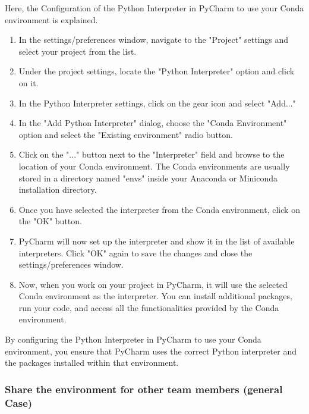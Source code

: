 Here, the Configuration of the Python Interpreter in PyCharm to use your Conda environment is explained.

\begin{enumerate}
	\item In the settings/preferences window, navigate to the "Project" settings and select your project from the list.
	
	\item Under the project settings, locate the "Python Interpreter" option and click on it.
	
	\item In the Python Interpreter settings, click on the gear icon and select "Add..."
	
	\item In the "Add Python Interpreter" dialog, choose the "Conda Environment" option and select the "Existing environment" radio button.
	
	\item Click on the "..." button next to the "Interpreter" field and browse to the location of your Conda environment. The Conda environments are usually stored in a directory named "envs" inside your Anaconda or Miniconda installation directory.
	
	\item Once you have selected the interpreter from the Conda environment, click on the "OK" button.
	
	\item PyCharm will now set up the interpreter and show it in the list of available interpreters. Click "OK" again to save the changes and close the settings/preferences window.
	
	\item Now, when you work on your project in PyCharm, it will use the selected Conda environment as the interpreter. You can install additional packages, run your code, and access all the functionalities provided by the Conda environment.
\end{enumerate}

By configuring the Python Interpreter in PyCharm to use your Conda environment, you ensure that PyCharm uses the correct Python interpreter and the packages installed within that environment.


\subsubsection{Share the environment for other team members (general Case)}

